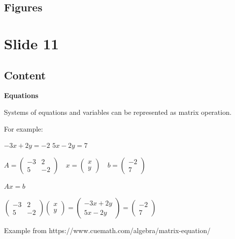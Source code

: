 \documentclass{article}%
\begin{document}
\subsection{Figures}%
\begin{figure}[H]%
\centering%
\end{figure}

%
\newpage%
\section{Slide 11}%
\label{sec:Slide11}%
\subsection{Content}%

\textbf{Equations}

Systems of equations and variables can be represented as matrix operation.

For example:

$-3x + 2y = -2$
$5x - 2y = 7$

$A = \begin{pmatrix} -3 & 2 \\ 5 & -2 \end{pmatrix} \quad x = \begin{pmatrix} x \\ y \end{pmatrix} \quad b = \begin{pmatrix} -2 \\ 7 \end{pmatrix}$

$Ax = b$

$\begin{pmatrix} -3 & 2 \\ 5 & -2 \end{pmatrix} \begin{pmatrix} x \\ y \end{pmatrix} = \begin{pmatrix} -3x + 2y \\ 5x - 2y \end{pmatrix} = \begin{pmatrix} -2 \\ 7 \end{pmatrix}$

Example from https://www.cuemath.com/algebra/matrix-equation/
%
\end{document}
